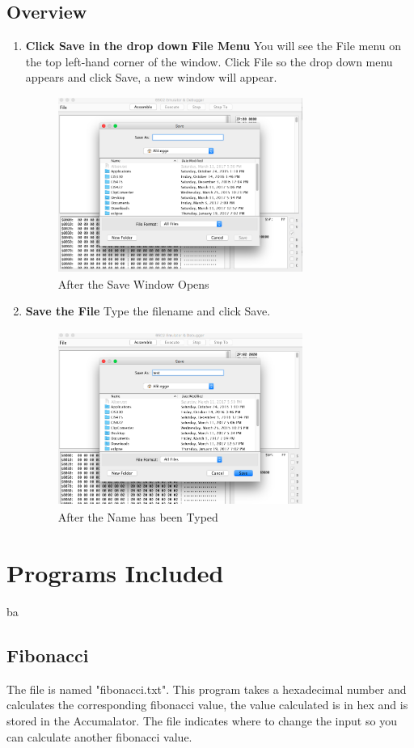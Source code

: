 \documentclass[a3paper, 11pt]{article}
\newlength{\drop}
\begin{document}
\subsection{Overview}
\begin{enumerate}
	\item \textbf{Click Save in the drop down File Menu}
	You will see the File menu on the top left-hand corner of the window. Click File so the drop down menu appears and click Save, a new window will appear. 
	\begin{figure}[h!]
		\centering
		\includegraphics[width=8cm, height=5.74cm]{Save}
		\caption{After the Save Window Opens}
	\end{figure}
	\item \textbf{Save the File}
	Type the filename and click Save.
	\begin{figure}[h!]
		\centering
		\includegraphics[width=8cm, height=5.74cm]{SaveText}
		\caption{After the Name has been Typed}
	\end{figure}
\end{enumerate}
\clearpage

\section{Programs Included}   ba
\subsection{Fibonacci}
The file is named "fibonacci.txt". This program takes a hexadecimal number and calculates the corresponding fibonacci value, the value calculated is in hex and is stored in the Accumalator. The file indicates where to change the input so you can calculate another fibonacci value.
\end{document}
